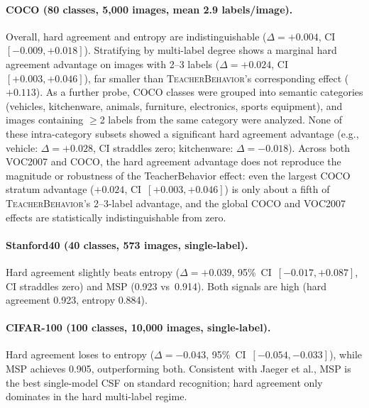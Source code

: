 \documentclass[a4paper,fleqn]{cas-sc}
\newcommand{\tb}{\textsc{TeacherBehavior}}
\begin{document}
\paragraph{COCO (80 classes, 5,000 images, mean 2.9 labels/image).}
Overall, hard agreement and entropy are indistinguishable ($\Delta = +0.004$, CI~$[-0.009,+0.018]$).
Stratifying by multi-label degree shows a marginal hard agreement advantage on images with 2--3 labels ($\Delta = +0.024$, CI~$[+0.003,+0.046]$), far smaller than \tb's corresponding effect ($+0.113$).
As a further probe, COCO classes were grouped into semantic categories (vehicles, kitchenware, animals, furniture, electronics, sports equipment), and images containing $\geq$2 labels from the same category were analyzed.
None of these intra-category subsets showed a significant hard agreement advantage (e.g., vehicle: $\Delta = +0.028$, CI straddles zero; kitchenware: $\Delta = -0.018$).
Across both VOC2007 and COCO, the hard agreement advantage does not reproduce the magnitude or robustness of the TeacherBehavior effect: even the largest COCO stratum advantage ($+0.024$, CI~$[+0.003,+0.046]$) is only about a fifth of \tb's 2--3-label advantage, and the global COCO and VOC2007 effects are statistically indistinguishable from zero.

\paragraph{Stanford40 (40 classes, 573 images, single-label).}
Hard agreement slightly beats entropy ($\Delta = +0.039$, 95\%~CI~$[-0.017,+0.087]$, CI straddles zero) and MSP (0.923 vs~0.914).
Both signals are high (hard agreement 0.923, entropy 0.884).

\paragraph{CIFAR-100 (100 classes, 10,000 images, single-label).}
Hard agreement loses to entropy ($\Delta = -0.043$, 95\%~CI~$[-0.054,-0.033]$), while MSP achieves 0.905, outperforming both.
Consistent with Jaeger et al., MSP is the best single-model CSF on standard recognition; hard agreement only dominates in the hard multi-label regime.
\end{document}
